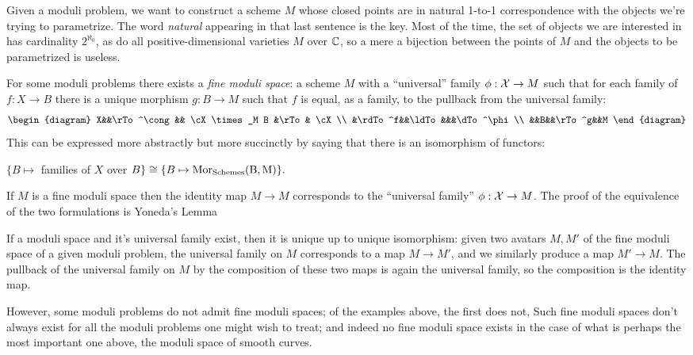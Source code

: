 Given a moduli problem, we want to construct a scheme $M$ whose closed points are in natural  1-to-1 correspondence with the objects we're trying to parametrize. The word \emph{natural} appearing in that last sentence is the key. Most of the time, the set of objects we are interested in has cardinality $2^{\aleph_0}$, as do all positive-dimensional varieties $M$ over ${\mathbb C}$, so a mere a bijection between the points of $M$ and the objects to be parametrized is useless.

For some moduli problems there exists a \emph{fine moduli space}: a scheme $M$ with a ``universal'' family $\phi: {\mathcal X}\to M$ such that for each family of $f: X\to B$
there is a unique morphism $g: B\to M$ such that $f$ is equal, as a family, to the pullback from the universal family:
$$
\begin{diagram}
 X&&\rTo^\cong && \cX \times_M B &\rTo& \cX\\
 &\rdTo^f&&\ldTo&&&\dTo^\phi\\
 &&B&&\rTo^g&&M
\end{diagram}
$$
This can be expressed more abstractly but more succinctly by saying that there is an isomorphism of functors:

\centerline{
$\{ B \mapsto$ families of $X$ over $B \} \cong \{ B\mapsto \rm{Mor}_{\rm Schemes}(B, M) \}.$
}

If $M$ is a fine moduli space then the identity map $M\to M$ corresponds to the ``universal family'' $\phi: {\mathcal X} \to M$. The proof of the equivalence of the two formulations is Yoneda's Lemma 

If a moduli space and it's universal family exist, then it is unique up to unique isomorphism: given two avatars $M,M'$ of the fine moduli space of a given moduli problem,
the universal family on $M$ corresponds to a map $M\to M'$, and we similarly produce a map $M'\to M$. The pullback of the universal family on $M$ by the composition of these two maps is again the universal family, so the composition is the identity map.

However, some moduli problems do not admit fine moduli spaces; of the examples above,
the first does not, Such fine moduli spaces don't always exist for all the moduli problems one might wish to treat; and indeed no fine
moduli space exists in the case of what is perhaps the most important one above, the moduli space of
smooth curves.  

